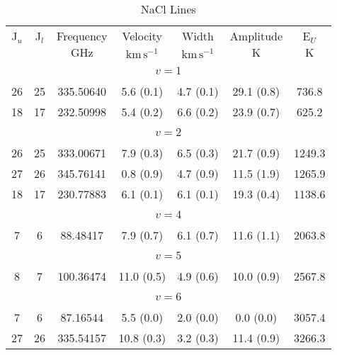 \begin{table*}[htp]
\centering
\caption{NaCl Lines}
\begin{tabular}{ccccccc}
\label{tab:NaCl_salt_lines}
 J$_u$ & J$_l$ & Frequency & Velocity & Width & Amplitude & E$_U$ \\
  &  & $\mathrm{GHz}$ & $\mathrm{km\,s^{-1}}$ & $\mathrm{km\,s^{-1}}$ & $\mathrm{K}$ & $\mathrm{K}$ \\
\hline
&\vspace{-0.75em}\\
\multicolumn{7}{c}{$v = 1$} \\
\vspace{-0.75em}\\
 26 & 25 & 335.50640 & 5.6 (0.1) & 4.7 (0.1) & 29.1 (0.8) & 736.8 \\
 18 & 17 & 232.50998 & 5.4 (0.2) & 6.6 (0.2) & 23.9 (0.7) & 625.2 \\
&\vspace{-0.75em}\\
\multicolumn{7}{c}{$v = 2$} \\
\vspace{-0.75em}\\
 26 & 25 & 333.00671 & 7.9 (0.3) & 6.5 (0.3) & 21.7 (0.9) & 1249.3 \\
 27 & 26 & 345.76141 & 0.8 (0.9) & 4.7 (0.9) & 11.5 (1.9) & 1265.9 \\
 18 & 17 & 230.77883 & 6.1 (0.1) & 6.1 (0.1) & 19.3 (0.4) & 1138.6 \\
&\vspace{-0.75em}\\
\multicolumn{7}{c}{$v = 4$} \\
\vspace{-0.75em}\\
 7 & 6 & 88.48417 & 7.9 (0.7) & 6.1 (0.7) & 11.6 (1.1) & 2063.8 \\
&\vspace{-0.75em}\\
\multicolumn{7}{c}{$v = 5$} \\
\vspace{-0.75em}\\
 8 & 7 & 100.36474 & 11.0 (0.5) & 4.9 (0.6) & 10.0 (0.9) & 2567.8 \\
&\vspace{-0.75em}\\
\multicolumn{7}{c}{$v = 6$} \\
\vspace{-0.75em}\\
 7 & 6 & 87.16544 & 5.5 (0.0) & 2.0 (0.0) & 0.0 (0.0) & 3057.4 \\
 27 & 26 & 335.54157 & 10.8 (0.3) & 3.2 (0.3) & 11.4 (0.9) & 3266.3 \\
\hline
\end{tabular}

\par 
\end{table*}
